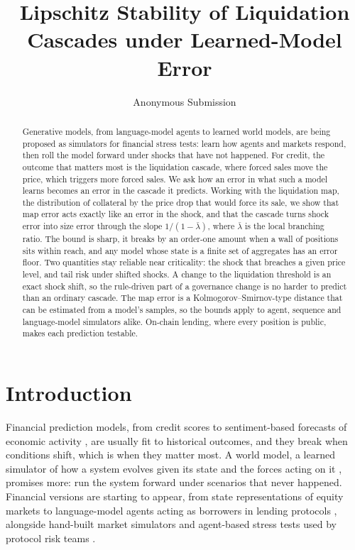 \documentclass[letterpaper]{article} %
\title{Lipschitz Stability of Liquidation Cascades under Learned-Model Error}
\author{
    Anonymous Submission
}
\theoremstyle{remark}
\begin{document}
\maketitle

\begin{abstract}
Generative models, from language-model agents to learned world models, are being proposed as simulators for financial stress tests: learn how agents and markets respond, then roll the model forward under shocks that have not happened. For credit, the outcome that matters most is the liquidation cascade, where forced sales move the price, which triggers more forced sales. We ask how an error in what such a model learns becomes an error in the cascade it predicts. Working with the liquidation map, the distribution of collateral by the price drop that would force its sale, we show that map error acts exactly like an error in the shock, and that the cascade turns shock error into size error through the slope $1/(1-\bar\lambda)$, where $\bar\lambda$ is the local branching ratio. The bound is sharp, it breaks by an order-one amount when a wall of positions sits within reach, and any model whose state is a finite set of aggregates has an error floor. Two quantities stay reliable near criticality: the shock that breaches a given price level, and tail risk under shifted shocks. A change to the liquidation threshold is an exact shock shift, so the rule-driven part of a governance change is no harder to predict than an ordinary cascade. The map error is a Kolmogorov--Smirnov-type distance that can be estimated from a model's samples, so the bounds apply to agent, sequence and language-model simulators alike. On-chain lending, where every position is public, makes each prediction testable.
\end{abstract}

\section{Introduction}

Financial prediction models, from credit scores to sentiment-based forecasts of economic activity \citep{nagarajan2024pebsa}, are usually fit to historical outcomes, and they break when conditions shift, which is when they matter most. A world model, a learned simulator of how a system evolves given its state and the forces acting on it \citep{ha2018recurrent,hafner2025dreamerv3}, promises more: run the system forward under scenarios that never happened. Financial versions are starting to appear, from state representations of equity markets \citep{merchant2026financial} to language-model agents acting as borrowers in lending protocols \citep{li2026llmborrowers}, alongside hand-built market simulators \citep{byrd2019abides} and agent-based stress tests used by protocol risk teams \citep{kao2020compound}.
\end{document}
